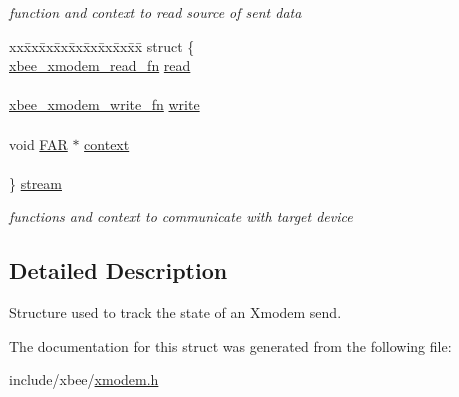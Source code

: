 \begin{DoxyCompactItemize}
\begin{tabbing}
\end{tabbing}\begin{DoxyCompactList}\small\item\em function and context to read source of sent data \end{DoxyCompactList}\item 
\begin{tabbing}
xx\=xx\=xx\=xx\=xx\=xx\=xx\=xx\=xx\=\kill
struct \{\\
\>\hyperlink{group__util__xmodem_ga25f49dbd4c2f9e274a32217a709d6382}{xbee\_xmodem\_read\_fn} \hyperlink{group__util__xmodem_gac73e7e9b654a58e232f8c1380cd68dfa}{read}\\
\>\\
\>\hyperlink{group__util__xmodem_ga57f329cc7f4e1b18f5baddb888221d7f}{xbee\_xmodem\_write\_fn} \hyperlink{group__util__xmodem_ga4224f3519ed62f804de9c45d0a409f94}{write}\\
\>\\
\>void \hyperlink{group__hal_gaef060b3456fdcc093a7210a762d5f2ed}{FAR} $\ast$ \hyperlink{group__util__xmodem_gaa91f8e864e06077c354e5f5216547758}{context}\\
\>\\
\} \hyperlink{group__util__xmodem_gac9e2099087190f80f9f0dd85363100b2}{stream}\\

\end{tabbing}\begin{DoxyCompactList}\small\item\em functions and context to communicate with target device \end{DoxyCompactList}\end{DoxyCompactItemize}


\subsection{Detailed Description}
Structure used to track the state of an Xmodem send. 

The documentation for this struct was generated from the following file\+:\begin{DoxyCompactItemize}
\item 
include/xbee/\hyperlink{xmodem_8h}{xmodem.\+h}\end{DoxyCompactItemize}
